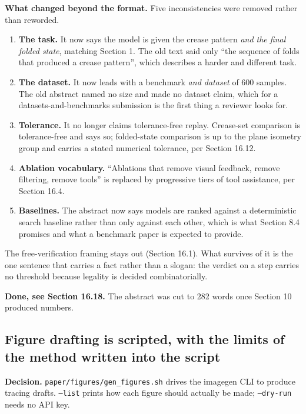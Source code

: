 \textbf{What changed beyond the format.} Five inconsistencies were removed rather than reworded.

\begin{enumerate}
\item \textbf{The task.} It now says the model is given the crease pattern \emph{and the final
  folded state}, matching Section 1. The old text said only ``the sequence of folds that produced a
  crease pattern'', which describes a harder and different task.
\item \textbf{The dataset.} It now leads with a benchmark \emph{and dataset} of 600 samples. The old
  abstract named no size and made no dataset claim, which for a datasets-and-benchmarks submission
  is the first thing a reviewer looks for.
\item \textbf{Tolerance.} It no longer claims tolerance-free replay. Crease-set comparison is
  tolerance-free and says so; folded-state comparison is up to the plane isometry group and carries
  a stated numerical tolerance, per Section 16.12.
\item \textbf{Ablation vocabulary.} ``Ablations that remove visual feedback, remove filtering,
  remove tools'' is replaced by progressive tiers of tool assistance, per Section 16.4.
\item \textbf{Baselines.} The abstract now says models are ranked against a deterministic search
  baseline rather than only against each other, which is what Section 8.4 promises and what a
  benchmark paper is expected to provide.
\end{enumerate}

The free-verification framing stays out (Section 16.1). What survives of it is the one sentence that
carries a fact rather than a slogan: the verdict on a step carries no threshold because legality is
decided combinatorially.

\textbf{Done, see Section 16.18.} The abstract was cut to 282 words once Section 10 produced
numbers.

\subsection{Figure drafting is scripted, with the limits of the method written into the script}

\textbf{Decision.} \texttt{paper/figures/gen\_figures.sh} drives the imagegen CLI to produce tracing
drafts. \texttt{--list} prints how each figure should actually be made; \texttt{--dry-run} needs no
API key.

